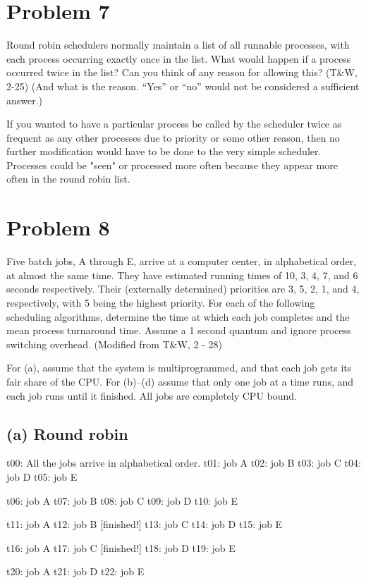 \documentclass[11pt]{article}
\begin{document}
\section*{Problem 7}
Round robin schedulers normally maintain a list of all runnable processes, with each process occurring exactly once in the list. What would happen if a process occurred twice in the list? Can you think of any reason for allowing this? (T\&W, 2-25) (And what is the reason. “Yes” or “no” would not be considered a sufficient answer.)

If you wanted to have a particular process be called by the scheduler twice as frequent as any other processes due to priority or some other reason, then no further modification would have to be done to the very simple scheduler. Processes could be "seen" or processed more often because they appear more often in the round robin list.


\section*{Problem 8}
Five batch jobs, A through E, arrive at a computer center, in alphabetical order, at almost the same time. They have estimated running times of 10, 3, 4, 7, and 6 seconds respectively. Their (externally determined) priorities are 3, 5, 2, 1, and 4, respectively, with 5 being the highest priority. For each of the following scheduling algorithms, determine the time at which each job completes and the mean process turnaround time. Assume a 1 second quantum and ignore process switching overhead. (Modified from T\&W, 2 - 28)

For (a), assume that the system is multiprogrammed, and that each job gets its fair share of the CPU. For (b)–(d) assume that only one job at a time runs, and each job runs until it finished. All jobs are completely CPU bound.

\subsection*{(a) Round robin}
t00: All the jobs arrive in alphabetical order. 
t01: job A
t02: job B
t03: job C
t04: job D
t05: job E

t06: job A
t07: job B
t08: job C
t09: job D
t10: job E

t11: job A
t12: job B [finished!]
t13: job C
t14: job D
t15: job E

t16: job A
t17: job C [finished!]
t18: job D
t19: job E

t20: job A
t21: job D
t22: job E
\end{document}
